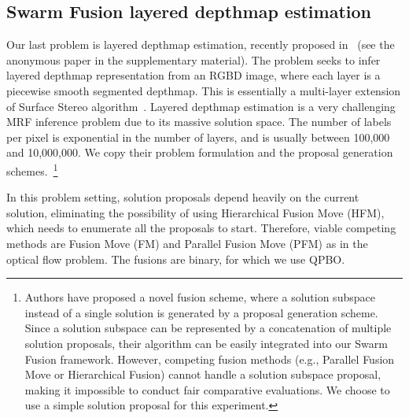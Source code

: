 \subsection{Swarm Fusion layered depthmap estimation}

Our last problem is layered depthmap estimation, recently proposed
in~\cite{layered_depthmap} (see the anonymous paper in the
supplementary material).  The problem seeks to infer layered depthmap
representation from an RGBD image, where each layer is a piecewise
smooth segmented depthmap. This is essentially a multi-layer extension
of Surface Stereo algorithm~\cite{surface_stereo}.
%
Layered depthmap estimation is a very challenging MRF inference problem
due to its massive solution space. The number of labels per pixel is
exponential in the number of layers, and is usually between 100,000 and
10,000,000. We copy their problem formulation and the proposal
generation schemes.~\footnote{Authors have proposed a novel fusion
scheme, where a solution subspace instead of a single solution is
generated by a proposal generation scheme. Since a solution subspace can
be represented by a concatenation of multiple solution proposals,
their algorithm can be easily integrated into our Swarm Fusion framework.
However, competing fusion methods (e.g., Parallel Fusion Move or
Hierarchical Fusion) cannot handle a solution subspace proposal, making
it impossible to conduct fair comparative evaluations. We choose to use
a simple solution proposal for this experiment.}


\noindent In this problem setting, solution proposals depend heavily on the current solution,
eliminating the possibility of using Hierarchical Fusion Move (HFM), which needs to
enumerate all the proposals to start. Therefore, viable competing
methods are Fusion Move (FM) and Parallel Fusion Move (PFM) as in the optical flow problem.
%
%
The fusions are binary, for which we use QPBO.

